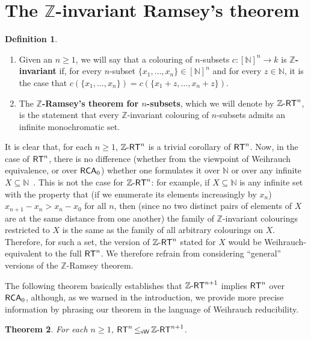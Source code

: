 \documentclass[11pt]{amsart}
\newcommand{\rt}{\mathnormal{\mathsf{RT}}}
\newcommand{\zrt}{\mathnormal{\mathbb Z\text{-}\mathsf{RT}}}
\newcommand{\rca}{\mathnormal{\mathsf{RCA}}_0}
\newcommand{\weisleq}{\mathop{\leq_{\mathrm{s}\mathsf{W}}}}
\newtheorem{theorem}{Theorem}%
\theoremstyle{definition}
\newtheorem{definition}[theorem]{Definition}
\begin{document}
\section{The $\mathbb Z$-invariant Ramsey's theorem}

\begin{definition}\hfill
\begin{enumerate}
\item Given an $n\geq 1$, we will say that a colouring of $n$-subsets $c:[\mathbb N]^n\longrightarrow k$ is {\bf $\mathbb Z$-invariant} if, for every $n$-subset $\{x_1,\ldots,x_n\}\in[\mathbb N]^n$ and for every $z\in\mathbb N$, it is the case that $c(\{x_1,\ldots,x_n\})=c(\{x_1+z,\ldots,x_n+z\})$.
\item The {\bf $\mathbb Z$-Ramsey's theorem for $n$-subsets}, which we will denote by $\zrt^n$, is the statement that every $\mathbb Z$-invariant colouring of $n$-subsets admits an infinite monochromatic set.
\end{enumerate}
\end{definition}

It is clear that, for each $n\geq 1$, $\zrt^n$ is a trivial corollary of $\rt^n$. Now, in the case of $\rt^n$, there is no difference (whether from the viewpoint of Weihrauch equivalence, or over $\rca$) whether one formulates it over $\mathbb N$ or over any infinite $X\subseteq\mathbb N$~\cite[Proposition 8.3.4]{dzhafarov-mummert-textbook}. This is not the case for $\zrt^n$: for example, if $X\subseteq\mathbb N$ is any infinite set with the property that (if we enumerate its elements increasingly by $x_n$) $x_{n+1}-x_n>x_n-x_0$ for all $n$, then (since no two distinct pairs of elements of $X$ are at the same distance from one another) the family of $\mathbb Z$-invariant colourings restricted to $X$ is the same as the family of all arbitrary colourings on $X$. Therefore, for such a set, the version of $\zrt^n$ stated for $X$ would be Weihrauch-equivalent to the full $\rt^n$. We therefore refrain from considering ``general'' versions of the $\mathbb Z$-Ramsey theorem.

The following theorem basically establishes that $\zrt^{n+1}$ implies $\rt^n$ over $\rca$, although, as we warned in the introduction, we provide more precise information by phrasing our theorem in the language of Weihrauch reducibility.

\begin{theorem}\label{thm2}
For each $n\geq 1$, $\rt^n\weisleq\zrt^{n+1}$.
\end{theorem}
\end{document}
